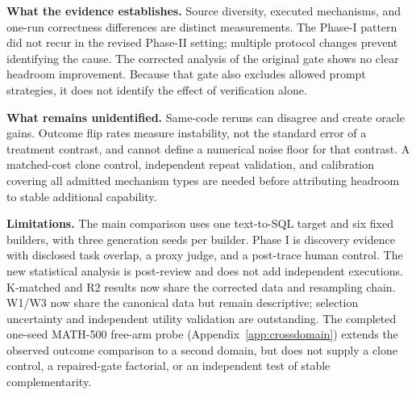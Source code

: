 \textbf{What the evidence establishes.} Source diversity, executed
mechanisms, and one-run correctness differences are distinct measurements.
The Phase-I pattern did not recur in the revised Phase-II setting; multiple
protocol changes prevent identifying the cause. The corrected analysis of
the original gate shows no clear headroom improvement. Because that gate
also excludes allowed prompt strategies, it does not identify the effect
of verification alone.

\textbf{What remains unidentified.} Same-code reruns can disagree and
create oracle gains. Outcome flip rates measure instability, not the
standard error of a treatment contrast, and cannot define a numerical
noise floor for that contrast. A matched-cost clone control, independent
repeat validation, and calibration covering all admitted mechanism types
are needed before attributing headroom to stable additional capability.

\textbf{Limitations.} The main comparison uses one text-to-SQL target and
six fixed builders, with three generation seeds per builder. Phase I is
discovery evidence with disclosed task overlap, a proxy judge, and a
post-trace human control. The new statistical analysis is post-review and
does not add independent executions. K-matched and R2 results now share the
corrected data and resampling chain. W1/W3 now share the canonical data
but remain descriptive; selection uncertainty and independent utility
validation are outstanding.
The completed one-seed MATH-500 free-arm probe
(Appendix~\ref{app:crossdomain}) extends the observed outcome comparison
to a second domain, but does not supply a clone control, a repaired-gate
factorial, or an independent test of stable complementarity.
